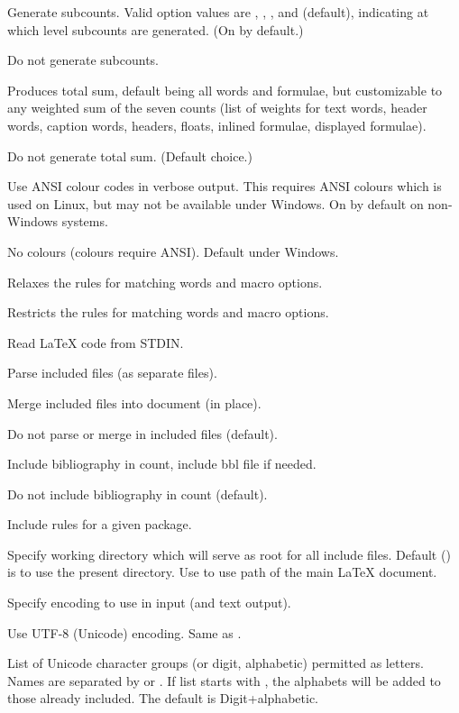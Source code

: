 \begin{description}
\option[-sub\alt{=\ldots}, -subcount\alt{=\ldots}]Generate subcounts. Valid option values are , , ,  and  (default), indicating at which level subcounts are generated. (On by default.)

\option[-nosub]Do not generate subcounts.

\option[-sum\alt{=n,n,\ldots}]Produces total sum, default being all words and formulae, but customizable to any weighted sum of the seven counts (list of weights for text words, header words, caption words, headers, floats, inlined formulae, displayed formulae).

\option[-nosum]Do not generate total sum. (Default choice.)

\option[-col]Use ANSI colour codes in verbose output. This requires ANSI colours which is used on Linux, but may not be available under Windows. On by default on non-Windows systems. 

\option[-nc, -nocol]No colours (colours require ANSI). Default under Windows.

\option[-relaxed]Relaxes the rules for matching words and macro options.

\option[-restricted]Restricts the rules for matching words and macro options.

\option[-]Read \LaTeX{} code from STDIN.

\option[-inc]Parse included files (as separate files).

\option[-merge]Merge included files into document (in place).

\option[-noinc]Do not parse or merge in included files (default).

\option[-incbib]Include bibliography in count, include bbl file if needed.

\option[-nobib]Do not include bibliography in count (default).

\option[-incpackage=]Include rules for a given package.

\option[-dir\alt{=\ldots}]Specify working directory which will serve as root for all include files. Default () is to use the present directory. Use  to use path of the main \LaTeX{} document.

\option[-enc=, -encoding=]Specify encoding to use in input (and text output).

Use UTF-8 (Unicode) encoding. Same as .

\option[-alpha=, -alphabets=]List of Unicode character groups (or digit, alphabetic) permitted as letters. Names are separated by \code{,} or \code{+}. If list starts with \code{+}, the alphabets will be added to those already included. The default is Digit+alphabetic.


\end{description}
